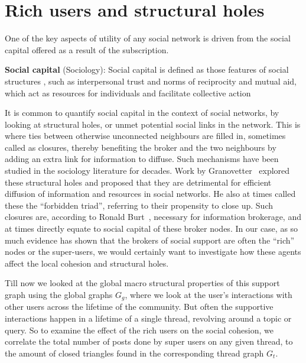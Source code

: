 \section{ Rich users and structural holes }
One of the key aspects of utility of any social network is driven from the social capital offered as a result of the subscription. 

\begin{definition}
    \textbf{Social capital} (Sociology): Social capital is defined as those features of social structures , such as interpersonal trust and norms of reciprocity and mutual aid, which act as resources for individuals and facilitate collective action~\cite{collins1993social,coleman1988social}
\end{definition} 

It is common to quantify social capital in the context of social networks, by looking at structural holes, or unmet potential social links in the network. This is where ties between otherwise unconnected neighbours are filled in, sometimes called as closures, thereby benefiting the broker and the two neighbours by adding an extra link for information to diffuse. 
Such mechanisms have been studied in the sociology literature for decades. Work by Granovetter~\cite{granovetter1977strength} explored these structural holes and proposed that they are detrimental for efficient diffusion of information and resources in social networks. He also at times called these the ``forbidden triad'', referring to their propensity to close up. Such closures are, according to Ronald Burt~\cite{burt2004structural,burt2009structural}, necessary for information brokerage, and at times directly equate to social capital of these broker nodes.
In our case, as so much evidence has shown that the brokers of social support are often the ``rich'' nodes or the super-users, we would certainly want to investigate how these agents affect the local cohesion and structural holes.

Till now we looked at the global macro structural properties of this support graph using the global graphs $G_g$, where we look at the user's interactions with other users across the lifetime of the community. But often the supportive interactions happen in a lifetime of a single thread, revolving around a topic or query. So to examine the effect of the rich users on the social cohesion, we correlate the total number of posts done by super users on any given thread, to the amount of closed triangles found in the corresponding thread graph $G_t$.  

